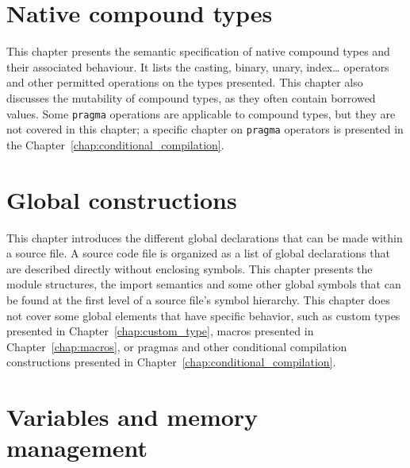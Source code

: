 \documentclass[twoside,a4paper,11pt]{book}
\begin{document}
\begin{multicols*}{2}
  \minitoc%
  
\end{multicols*}



\chapter{Native compound types}
\label{chap:compound}

This chapter presents the semantic specification of native compound types and
their associated behaviour. It lists the casting, binary, unary, index\ldots
operators and other permitted operations on the types presented. This chapter
also discusses the mutability of compound types, as they often contain borrowed
values. Some \texttt{pragma} operations are applicable to compound types, but
they are not covered in this chapter; a specific chapter on \texttt{pragma}
operators is presented in the Chapter~\ref{chap:conditional_compilation}.

\begin{multicols*}{2}
  \minitoc%
  
\end{multicols*}



\chapter{Global constructions}%
\label{chap:global_construction}

This chapter introduces the different global declarations that can be made
within a source file. A source code file is organized as a list of global
declarations that are described directly without enclosing symbols. This chapter
presents the module structures, the import semantics and some other global
symbols that can be found at the first level of a source file's symbol
hierarchy. This chapter does not cover some global elements that have specific
behavior, such as custom types presented in Chapter~\ref{chap:custom_type},
macros presented in Chapter~\ref{chap:macros}, or pragmas and other conditional
compilation constructions presented in
Chapter~\ref{chap:conditional_compilation}.

\begin{multicols*}{2}
  \minitoc%
  
\end{multicols*}


\chapter{Variables and memory management}
\label{chap:variables}
\end{document}
